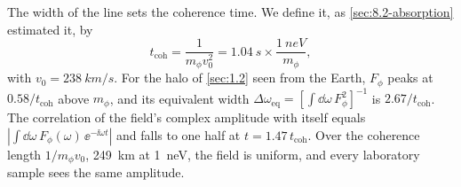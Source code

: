 The width of the line sets the coherence time. We define it, as \cref{sec:8.2-absorption} estimated it, by
\begin{equation}
  t_{\mathrm{coh}} = \frac{1}{m_\phi v_0^2} = \SI{1.04}{s}\times\frac{\SI{1}{neV}}{m_\phi} ,
  \label{eq:14.6-tcoh}
\end{equation}
with $v_0 = \SI{238}{km/s}$. For the halo of \cref{sec:1.2} seen from the Earth, $F_\phi$ peaks at $0.58/t_{\mathrm{coh}}$ above $m_\phi$, and its equivalent width $\Delta\omega_{\mathrm{eq}} = [\int\dd\omega\,F_\phi^2]^{-1}$ is $2.67/t_{\mathrm{coh}}$. The correlation of the field's complex amplitude with itself equals $|\int\dd\omega\,F_\phi(\omega)\,\ee^{-\ii\omega t}|$ and falls to one half at $t = 1.47\,t_{\mathrm{coh}}$. Over the coherence length $1/m_\phi v_0$, \SI{249}{km} at \SI{1}{neV}, the field is uniform, and every laboratory sample sees the same amplitude.

